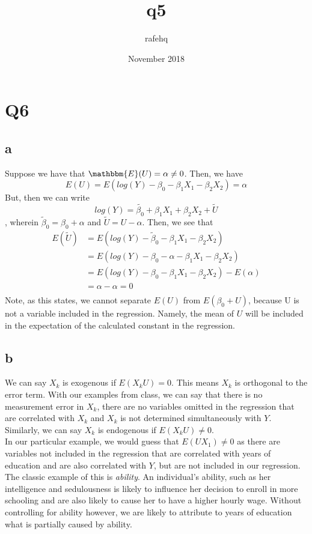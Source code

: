 \documentclass{article}
\title{q5}
\author{rafehq }
\date{November 2018}
\begin{document}
\maketitle

\section{Q6}
\subsection*{a} Suppose we have that $\mathbbm{E}(U) = \alpha\neq 0$. Then, we have 
$$E(U) = E(log(Y) - \beta_0 - \beta_1 X_1- \beta_2 X_2) = \alpha$$
But, then we can write $$log(Y) = \tilde{\beta_0} + \beta_1 X_1 + \beta_2X_2 + \tilde U$$, wherein $\tilde \beta_0 = \beta_0+ \alpha$ and $\tilde U = U - \alpha$. Then, we see that 
\begin{align*}
E (\tilde U) & = E(log(Y) - \tilde \beta_0 - \beta_1 X_1 - \beta_2 X_2) \\
 & = E(log(Y) - \beta_0 - \alpha - \beta_1 X_1 - \beta_2 X_2) \\
 & = E(log(Y) - \beta_0  - \beta_1 X_1 - \beta_2 X_2) - E(\alpha) \\
 & = \alpha - \alpha = 0 \\
\end{align*}
Note, as this states, we cannot separate $E(U)$ from $E(\beta_0 + U)$, because U is not a variable included in the regression. Namely, the mean of $U$ will be included in the expectation of the calculated constant in the regression. \\
\subsection*{b} We can say $X_k$ is exogenous if $E(X_k U) = 0$. This means $X_k$ is orthogonal to the error term. With our examples from class, we can say that there is no measurement error in $X_k$, there are no variables omitted in the regression that are correlated with $X_k$ and $X_k$ is not determined simultaneously with $Y$.  \\
Similarly, we can say $X_k$ is endogenous if $E(X_k U) \neq 0$. \\
In our particular example, we would guess that $E(U X_1)\neq 0$ as there are variables not included in the regression that are correlated with years of education and are also correlated with $Y$, but are not included in our regression. The classic example of this is \textit{ability}. An individual's ability, such as her intelligence and sedulousness is likely to influence her decision to enroll in more schooling and are also likely to cause her to have a higher hourly wage. Without controlling for ability however, we are likely to attribute to years of education what is partially caused by ability. \par 
\end{document}
